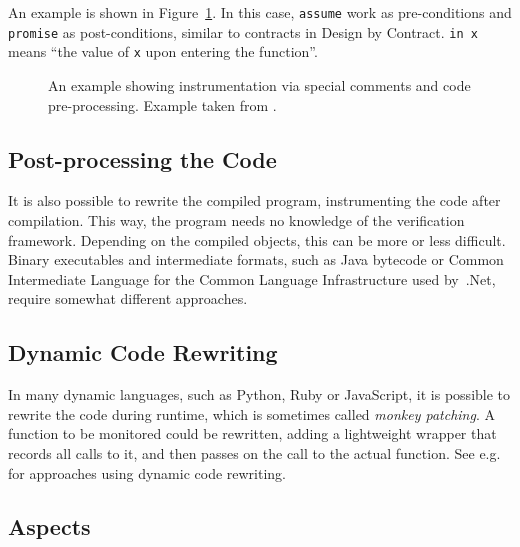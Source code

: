 An example is shown in Figure~\ref{figure-pre-processing-comments-example}. In
this case, \texttt{assume} work as pre-conditions and \texttt{promise} as
post-conditions, similar to contracts in Design by Contract. \texttt{in x}
means ``the value of \texttt{x} upon entering the function''.

\begin{figure}[h!]
	\begin{center}
	\begin{minipage}{0.7\textwidth}
    \lstset{language=C}
		
	\end{minipage}
	\end{center}
  \caption{An example showing instrumentation via special comments and code
    pre-processing. Example taken from \cite{rosenblum95practicalassertions}.}
	\label{figure-pre-processing-comments-example}
\end{figure}


\subsection{Post-processing the Code}

It is also possible to rewrite the compiled program, instrumenting the code
after compilation. This way, the program needs no knowledge of the verification
framework. Depending on the compiled objects, this can be more or less
difficult. Binary executables and intermediate formats, such as Java bytecode
or Common Intermediate Language for the Common Language Infrastructure used
by~.Net, require somewhat different approaches.


\subsection{Dynamic Code Rewriting}

In many dynamic languages, such as Python, Ruby or JavaScript, it is possible
to rewrite the code during runtime, which is sometimes called \textit{monkey
patching}. A function to be monitored could be rewritten, adding a lightweight
wrapper that records all calls to it, and then passes on the call to the actual
function. See e.g.\ \cite{matusiak09aoppy} for approaches using dynamic code
rewriting.


\subsection{Aspects} \label{section-aspects}

